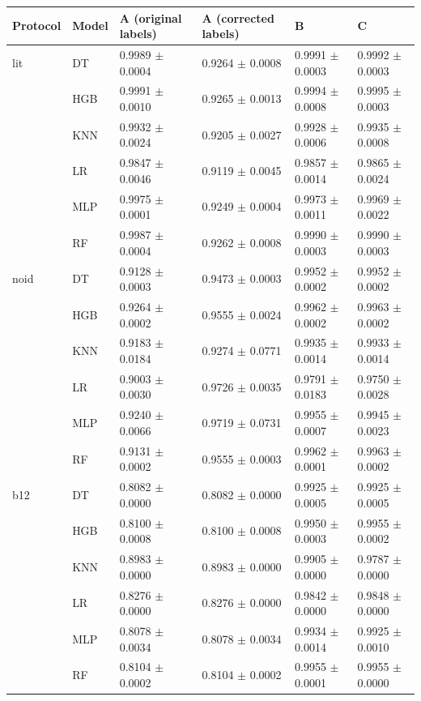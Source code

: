\begin{tabular}{ll llll}
\toprule
Protocol & Model & A (original labels) & A (corrected labels) & B & C\\
\midrule
lit & DT & 0.9989 $\pm$ 0.0004 & 0.9264 $\pm$ 0.0008 & 0.9991 $\pm$ 0.0003 & 0.9992 $\pm$ 0.0003\\
 & HGB & 0.9991 $\pm$ 0.0010 & 0.9265 $\pm$ 0.0013 & 0.9994 $\pm$ 0.0008 & 0.9995 $\pm$ 0.0003\\
 & KNN & 0.9932 $\pm$ 0.0024 & 0.9205 $\pm$ 0.0027 & 0.9928 $\pm$ 0.0006 & 0.9935 $\pm$ 0.0008\\
 & LR & 0.9847 $\pm$ 0.0046 & 0.9119 $\pm$ 0.0045 & 0.9857 $\pm$ 0.0014 & 0.9865 $\pm$ 0.0024\\
 & MLP & 0.9975 $\pm$ 0.0001 & 0.9249 $\pm$ 0.0004 & 0.9973 $\pm$ 0.0011 & 0.9969 $\pm$ 0.0022\\
 & RF & 0.9987 $\pm$ 0.0004 & 0.9262 $\pm$ 0.0008 & 0.9990 $\pm$ 0.0003 & 0.9990 $\pm$ 0.0003\\
\midrule
noid & DT & 0.9128 $\pm$ 0.0003 & 0.9473 $\pm$ 0.0003 & 0.9952 $\pm$ 0.0002 & 0.9952 $\pm$ 0.0002\\
 & HGB & 0.9264 $\pm$ 0.0002 & 0.9555 $\pm$ 0.0024 & 0.9962 $\pm$ 0.0002 & 0.9963 $\pm$ 0.0002\\
 & KNN & 0.9183 $\pm$ 0.0184 & 0.9274 $\pm$ 0.0771 & 0.9935 $\pm$ 0.0014 & 0.9933 $\pm$ 0.0014\\
 & LR & 0.9003 $\pm$ 0.0030 & 0.9726 $\pm$ 0.0035 & 0.9791 $\pm$ 0.0183 & 0.9750 $\pm$ 0.0028\\
 & MLP & 0.9240 $\pm$ 0.0066 & 0.9719 $\pm$ 0.0731 & 0.9955 $\pm$ 0.0007 & 0.9945 $\pm$ 0.0023\\
 & RF & 0.9131 $\pm$ 0.0002 & 0.9555 $\pm$ 0.0003 & 0.9962 $\pm$ 0.0001 & 0.9963 $\pm$ 0.0002\\
\midrule
b12 & DT & 0.8082 $\pm$ 0.0000 & 0.8082 $\pm$ 0.0000 & 0.9925 $\pm$ 0.0005 & 0.9925 $\pm$ 0.0005\\
 & HGB & 0.8100 $\pm$ 0.0008 & 0.8100 $\pm$ 0.0008 & 0.9950 $\pm$ 0.0003 & 0.9955 $\pm$ 0.0002\\
 & KNN & 0.8983 $\pm$ 0.0000 & 0.8983 $\pm$ 0.0000 & 0.9905 $\pm$ 0.0000 & 0.9787 $\pm$ 0.0000\\
 & LR & 0.8276 $\pm$ 0.0000 & 0.8276 $\pm$ 0.0000 & 0.9842 $\pm$ 0.0000 & 0.9848 $\pm$ 0.0000\\
 & MLP & 0.8078 $\pm$ 0.0034 & 0.8078 $\pm$ 0.0034 & 0.9934 $\pm$ 0.0014 & 0.9925 $\pm$ 0.0010\\
 & RF & 0.8104 $\pm$ 0.0002 & 0.8104 $\pm$ 0.0002 & 0.9955 $\pm$ 0.0001 & 0.9955 $\pm$ 0.0000\\

\end{tabular}
